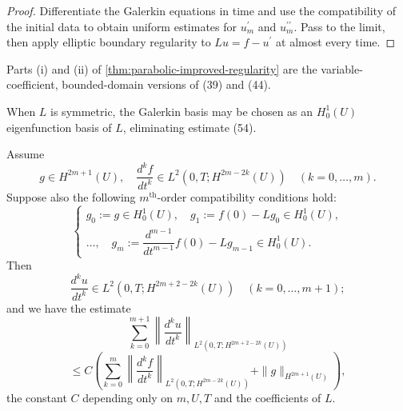 \begin{proof}
\sketch Differentiate the Galerkin equations in time and use the compatibility of the initial data to obtain uniform estimates for $u_m^{\prime}$ and $u_m^{\prime\prime}$. Pass to the limit, then apply elliptic boundary regularity to $Lu=f-u^{\prime}$ at almost every time.
\end{proof}

\begin{remark}
\label{rem:parabolic-improved-regularity-remark}

Parts (i) and (ii) of \cref{thm:parabolic-improved-regularity} are the variable-coefficient, bounded-domain versions of (39) and (44).
\end{remark}

\begin{remark}
\label{rem:parabolic-regularity-symmetric-eigenfunctions}

When $L$ is symmetric, the Galerkin basis may be chosen as an $H_0^1(U)$ eigenfunction basis of $L$, eliminating estimate (54).
\end{remark}

\begin{theorem}
\label{thm:parabolic-higher-regularity}

Assume
\[
g \in H^{2m+1}(U), \quad \frac{d^k f}{dt^k} \in L^2(0,T; H^{2m-2k}(U)) \quad (k=0,\ldots,m).
\]
Suppose also the following $m^{\text{th}}$-order compatibility conditions hold:
\[
\begin{cases}
g_0 := g \in H^1_0(U), \quad g_1 := f(0) - Lg_0 \in H^1_0(U), \\
\ldots, \quad g_m := \dfrac{d^{m-1}}{dt^{m-1}}f(0) - Lg_{m-1} \in H^1_0(U).
\end{cases}
\]
Then
\[
\frac{d^k u}{dt^k} \in L^2(0,T; H^{2m+2-2k}(U)) \quad (k=0,\ldots,m+1);
\]
and we have the estimate
\[
\sum_{k=0}^{m+1} \left\| \frac{d^k u}{dt^k} \right\|_{L^2(0,T;H^{2m+2-2k}(U))}
\]
\[
\leq C \left( \sum_{k=0}^{m} \left\| \frac{d^k f}{dt^k} \right\|_{L^2(0,T;H^{2m-2k}(U))} + \|g\|_{H^{2m+1}(U)} \right),
\tag{55}
\]
the constant $C$ depending only on $m, U, T$ and the coefficients of $L$.
\end{theorem}

